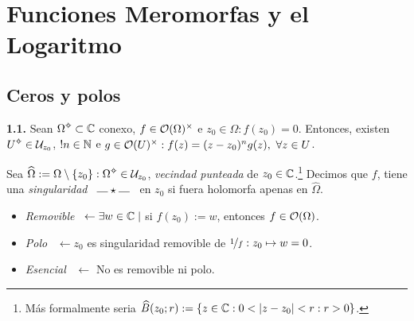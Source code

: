 \section{Funciones Meromorfas y el Logaritmo}

\subsection*{Ceros y polos }



\hypertarget{thm311}{}
\begin{theorem}
    \textbf{1.1.} Sean \(\Omega\ab\subset \C\) conexo, \( f \in \mathcal{O}(\Omega)^\times\) e \(z_0 \in \Omega : f(z_0) = 0\). Entonces, existen \(U\ab \in \U_{z_0}\),  \(!n \in \mathbb{N} \) e \(g \in \ho(U)^\times : f(z) = (z-z_0)^n g(z), \ \forall z \in U\).  
\end{theorem}


\begin{definition}
    Sea \(\widehat{\Omega}:= \Omega \setminus \{z_0\} : \Omega\ab \in \U_{z_0} \), \emph{vecindad punteada} de \(z_0 \in \mathbb{C}\).\footnote{Más formalmente seria \(\widehat{B}(z_0;r):= \{z\in \mathbb{C} : 0 < |z-z_0|<r : r >0\}\).} Decimos que \(f\), tiene una \emph{singularidad} \ \(\rotatebox{90}{$|$} \star  \rotatebox{90}{$|$}\) \ en \(z_0\) si fuera holomorfa apenas en  \(\widehat{\Omega}\). 
    \vspace{-0.2cm} 
    \begin{itemize}[left = 1cm, label = \(\star\)]
        \item \emph{Removible} \ \(\leftarrow \exists w \in \mathbb{C} \mid\) si \(f(z_0):= w\), entonces \(f\in \mathcal{O}(\Omega)\).     
        \item \emph{Polo} \ \(\leftarrow z_0\) es singularidad removible de \(\nicefrac{1}{f}: z_0\mapsto w =0\).%
        \item \emph{Esencial} \ \(\leftarrow \) No es removible ni polo. 
    \end{itemize}
\end{definition}

